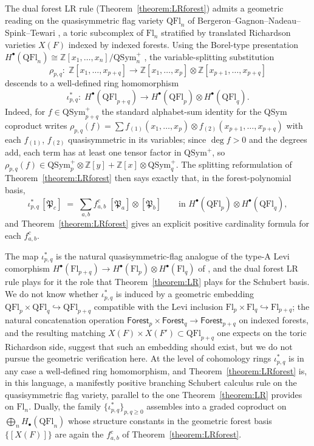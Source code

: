\documentclass{amsart}
\theoremstyle{definition}
\theoremstyle{remark}
\numberwithin{equation}{subsection}
\newcommand{\forest}{\mathfrak{P}}
\begin{document}
The dual forest LR rule (Theorem~\ref{theorem:LRforest}) admits a geometric reading on the quasisymmetric flag variety $\mathrm{QFl}_n$ of Bergeron--Gagnon--Nadeau--Spink--Tewari \cite{bergeron2025qsymflag}, a toric subcomplex of $\mathrm{Fl}_n$ stratified by translated Richardson varieties $X(F)$ indexed by indexed forests. Using the Borel-type presentation $H^\bullet(\mathrm{QFl}_n)\cong \mathbb{Z}[x_1,\ldots,x_n]/\mathrm{QSym}_n^+$ \cite[Theorem~A and Corollary~12.5]{bergeron2025qsymflag}, the variable-splitting substitution
$$\rho_{p,q}:\;\mathbb{Z}[x_1,\ldots,x_{p+q}]\longrightarrow \mathbb{Z}[x_1,\ldots,x_p]\otimes \mathbb{Z}[x_{p+1},\ldots,x_{p+q}]$$
descends to a well-defined ring homomorphism
$$\iota_{p,q}^*:\;H^\bullet(\mathrm{QFl}_{p+q})\longrightarrow H^\bullet(\mathrm{QFl}_p)\otimes H^\bullet(\mathrm{QFl}_q).$$
Indeed, for $f\in\mathrm{QSym}_{p+q}^+$ the standard alphabet-sum identity for the QSym coproduct writes $\rho_{p,q}(f) = \sum f_{(1)}(x_1,\ldots,x_p)\otimes f_{(2)}(x_{p+1},\ldots,x_{p+q})$ with each $f_{(1)}$, $f_{(2)}$ quasisymmetric in its variables; since $\deg f>0$ and the degrees add, each term has at least one tensor factor in $\mathrm{QSym}^+$, so $\rho_{p,q}(f)\in \mathrm{QSym}_p^+\otimes\mathbb{Z}[y] + \mathbb{Z}[x]\otimes \mathrm{QSym}_q^+$. The splitting reformulation of Theorem~\ref{theorem:LRforest} then says exactly that, in the forest-polynomial basis,
$$\iota_{p,q}^*\,[\forest_c] \;=\; \sum_{a,b} f_{a,b}^c\;[\forest_a]\otimes [\forest_b]\qquad\text{in } H^\bullet(\mathrm{QFl}_p)\otimes H^\bullet(\mathrm{QFl}_q),$$
and Theorem~\ref{theorem:LRforest} gives an explicit positive cardinality formula for each $f_{a,b}^c$.

The map $\iota_{p,q}^*$ is the natural quasisymmetric-flag analogue of the type-A Levi comorphism $H^\bullet(\mathrm{Fl}_{p+q})\to H^\bullet(\mathrm{Fl}_p)\otimes H^\bullet(\mathrm{Fl}_q)$ of \cite{ressayre2009branching}, and the dual forest LR rule plays for it the role that Theorem~\ref{theorem:LR} plays for the Schubert basis. We do not know whether $\iota_{p,q}^*$ is induced by a geometric embedding $\mathrm{QFl}_p\times \mathrm{QFl}_q\hookrightarrow \mathrm{QFl}_{p+q}$ compatible with the Levi inclusion $\mathrm{Fl}_p\times \mathrm{Fl}_q\hookrightarrow \mathrm{Fl}_{p+q}$; the natural concatenation operation $\mathsf{Forest}_p\times \mathsf{Forest}_q\to \mathsf{Forest}_{p+q}$ on indexed forests, and the resulting matching $X(F)\times X(F')\subset \mathrm{QFl}_{p+q}$ one expects on the toric Richardson side, suggest that such an embedding should exist, but we do not pursue the geometric verification here. At the level of cohomology rings $\iota_{p,q}^*$ is in any case a well-defined ring homomorphism, and Theorem~\ref{theorem:LRforest} is, in this language, a manifestly positive branching Schubert calculus rule on the quasisymmetric flag variety, parallel to the one Theorem~\ref{theorem:LR} provides on $\mathrm{Fl}_n$. Dually, the family $\{\iota_{p,q}^*\}_{p,q\geq 0}$ assembles into a graded coproduct on $\bigoplus_n H_\bullet(\mathrm{QFl}_n)$ whose structure constants in the geometric forest basis $\{[X(F)]\}$ are again the $f_{a,b}^c$ of Theorem~\ref{theorem:LRforest}.
\end{document}

